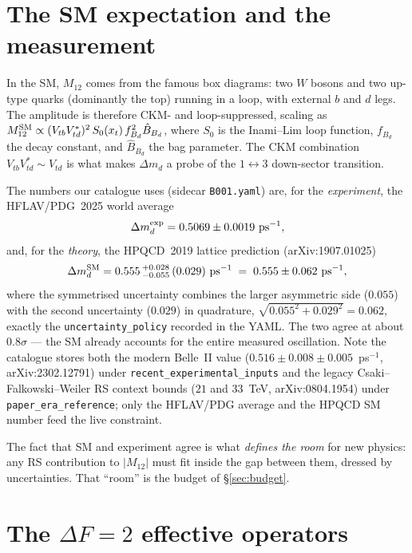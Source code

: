 \documentclass[11pt]{article}
\newcommand{\Mtwelve}{M_{12}}
\newcommand{\dmd}{\Delta m_d}
\newcommand{\code}[1]{\texttt{#1}}
\theoremstyle{definition}
\begin{document}
\section{The SM expectation and the measurement}
\label{sec:smvalue}

In the SM, $\Mtwelve$ comes from the famous box diagrams: two $W$ bosons and two
up-type quarks (dominantly the top) running in a loop, with external $b$ and $d$
legs. The amplitude is therefore CKM- and loop-suppressed, scaling as
$\Mtwelve^{\rm SM}\propto (V_{tb}V_{td}^*)^2\, S_0(x_t)\, f_{B_d}^2\hat B_{B_d}$,
where $S_0$ is the Inami--Lim loop function, $f_{B_d}$ the decay constant, and
$\hat B_{B_d}$ the bag parameter. The CKM combination $V_{tb}V_{td}^*\sim
V_{td}$ is what makes $\dmd$ a probe of the $1\!\leftrightarrow\!3$ down-sector
transition.

The numbers our catalogue uses (sidecar \code{B001.yaml}) are, for the
\emph{experiment}, the HFLAV/PDG~2025 world average
\begin{equation}
\dmd^{\rm exp} = 0.5069 \pm 0.0019~\text{ps}^{-1},
\label{eq:dmdexp}
\end{equation}
and, for the \emph{theory}, the HPQCD~2019 lattice prediction (arXiv:1907.01025)
\begin{equation}
\dmd^{\rm SM} = 0.555\,{}^{+0.028}_{-0.055}\,(0.029)~\text{ps}^{-1}
   \;=\; 0.555 \pm 0.062~\text{ps}^{-1},
\label{eq:dmdsm}
\end{equation}
where the symmetrised uncertainty combines the larger asymmetric side
($0.055$) with the second uncertainty ($0.029$) in quadrature,
$\sqrt{0.055^2+0.029^2}=0.062$, exactly the \code{uncertainty\_policy} recorded
in the YAML. The two agree at about $0.8\sigma$ --- the SM already accounts for
the entire measured oscillation. Note the catalogue stores both the modern
Belle~II value ($0.516\pm0.008\pm0.005$~ps$^{-1}$, arXiv:2302.12791) under
\code{recent\_experimental\_inputs} and the legacy Csaki--Falkowski--Weiler RS
context bounds ($21$ and $33$~TeV, arXiv:0804.1954) under
\code{paper\_era\_reference}; only the HFLAV/PDG average and the HPQCD SM number
feed the live constraint.

The fact that SM and experiment agree is what \emph{defines the room} for new
physics: any RS contribution to $|\Mtwelve|$ must fit inside the gap between them,
dressed by uncertainties. That ``room'' is the budget of \S\ref{sec:budget}.

\section{The $\Delta F=2$ effective operators}
\label{sec:operators}
\end{document}
